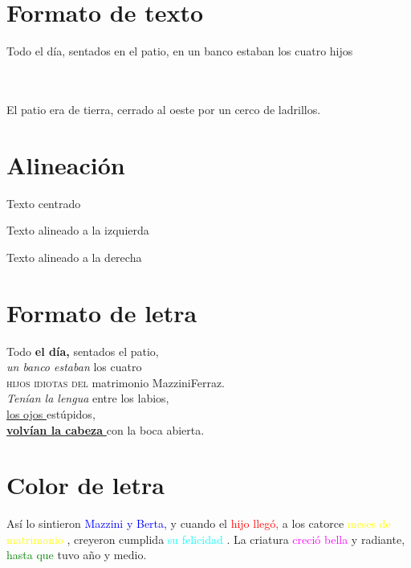 \documentclass[12pt,latterpaper]{article}
\begin{document}
\section{Formato de texto}

Todo el día, sentados en el patio, en un banco estaban los cuatro
hijos \\
\\

\\

\centerline{El patio era de tierra, cerrado al oeste por un cerco de
ladrillos.}



\section{Alineación}

\begin {center}
Texto centrado
\end {center}

\begin {flushleft}
Texto alineado a la izquierda
\end {flushleft}

\begin {flushright}
Texto alineado a la derecha
\end {flushright}


\section{Formato de letra}

Todo \textbf{el día, } sentados el patio,\\
\textit{un banco estaban } los cuatro\\
\textsc{hijos idiotas del} matrimonio MazziniFerraz.\\
\textsl{Tenían la lengua} entre los labios,\\
\underline{los ojos } estúpidos,\\
\underline { \textbf {volvían la cabeza }} con la boca abierta.

\section{Color de letra}

Así lo sintieron \textcolor{blue}{Mazzini y Berta,} y cuando el
\textcolor{red}{hijo llegó,} a los catorce
\textcolor{yellow}{meses de matrimonio} , creyeron cumplida \textcolor{cyan}{su felicidad} .
La criatura \textcolor{magenta}{creció bella } y radiante, \textcolor{green}{hasta que} tuvo año y medio.
\end{document}
